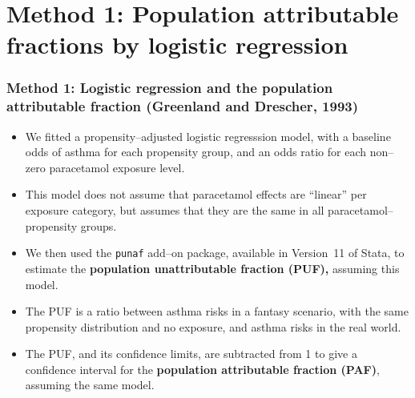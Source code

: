 \documentclass[11pt]{beamer}
\begin{document}
\section{Method 1: Population attributable fractions by logistic regression}

\begin{frame}
\frametitle{Method 1: Logistic regression and the population attributable fraction (Greenland and Drescher, 1993\cite{greenland1993})}

\begin{itemize}

\item<2-> We fitted a propensity--adjusted logistic regresssion model,
with a baseline odds of asthma for each propensity group,
and an odds ratio for each non--zero paracetamol exposure level.

\item<3-> This model does not assume that paracetamol effects are ``linear'' per exposure category,
but assumes that they are the same in all paracetamol--propensity groups.

\item<4-> We then used the \texttt{punaf} add--on package,
available in Version~11 of Stata,
to estimate the \textbf{population unattributable fraction (PUF),}
assuming this model.

\item<5-> The PUF is a ratio between asthma risks
in a fantasy scenario, with the same propensity distribution and no exposure,
and asthma risks in the real world.

\item<6-> The PUF, and its confidence limits, are subtracted from 1
to give a confidence interval for the \textbf{population attributable fraction (PAF)},
assuming the same model.

\end{itemize}

\end{frame}
\end{document}
